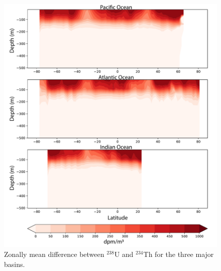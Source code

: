\clearpage
\begin{figure}[bp!]
\includegraphics[width=1.0\textwidth,center]{Meridian_distribution.pdf}
\caption{Zonally mean difference between $^{238}$U and $^{234}$Th for the three major basins.}
\label{fig:Meridian_distribution}
\end{figure}

%
%
%


